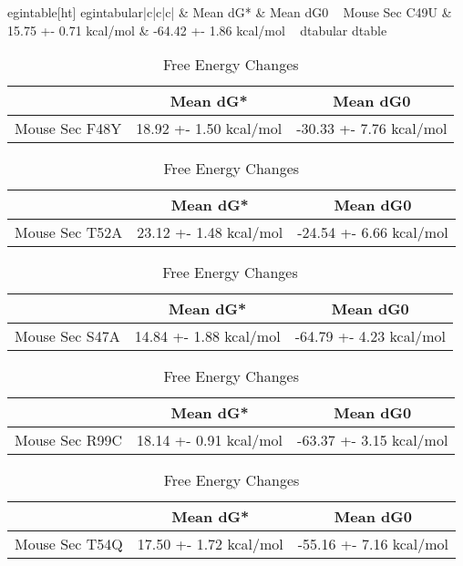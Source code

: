 
egin{table}[ht]
egin{tabular}{|c|c|c|}
\hline
  & Mean dG* & Mean dG0 \
\hline
Mouse Sec C49U & 15.75 +- 0.71 kcal/mol & -64.42 +- 1.86 kcal/mol \
\hline
d{tabular}
d{table}

\begin{table}[ht]
    \centering
    \begin{tabular}{|c|c|c|}
    \hline
      & Mean dG* & Mean dG0 \\
    \hline
    Mouse Sec F48Y & 18.92 +- 1.50 kcal/mol & -30.33 +- 7.76 kcal/mol \\
    \hline
    \end{tabular}
    \caption{Free Energy Changes}
    \end{table}

    \begin{table}[ht]
      \centering
      \begin{tabular}{|c|c|c|}
      \hline
        & Mean dG* & Mean dG0 \\
      \hline
      Mouse Sec T52A & 23.12 +- 1.48 kcal/mol & -24.54 +- 6.66 kcal/mol \\
      \hline
      \end{tabular}
      \caption{Free Energy Changes}
      \end{table}

    \begin{table}[ht]
        \centering
        \begin{tabular}{|c|c|c|}
        \hline
          & Mean dG* & Mean dG0 \\
        \hline
        Mouse Sec  S47A & 14.84 +- 1.88 kcal/mol & -64.79 +- 4.23 kcal/mol \\
        \hline
        \end{tabular}
        \caption{Free Energy Changes}
        \end{table}

        \begin{table}[ht]
          \centering
          \begin{tabular}{|c|c|c|}
          \hline
            & Mean dG* & Mean dG0 \\
          \hline
          Mouse Sec  R99C & 18.14 +- 0.91 kcal/mol & -63.37 +- 3.15 kcal/mol \\
          \hline
          \end{tabular}
          \caption{Free Energy Changes}
          \end{table}

            \begin{table}[ht]
                \centering
                \begin{tabular}{|c|c|c|}
                \hline
                  & Mean dG* & Mean dG0 \\
                \hline
                Mouse Sec T54Q & 17.50 +- 1.72 kcal/mol & -55.16 +- 7.16 kcal/mol \\
                \hline
                \end{tabular}
                \caption{Free Energy Changes}
                \end{table}

